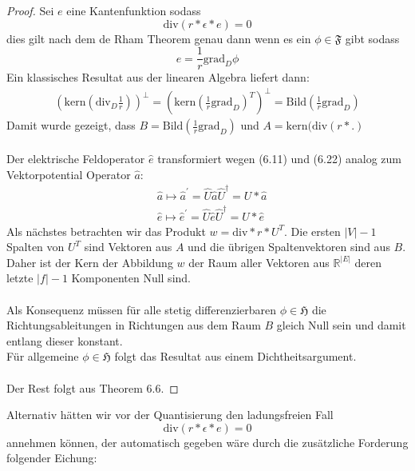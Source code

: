 \documentclass[11pt,a4paper,leqno]{report}
\numberwithin{equation}{chapter}
\begin{document}
\begin{proof}
	Sei $e$ eine Kantenfunktion sodass 
	\begin{equation*}
		\text{div}(r * \epsilon * e) = 0
	\end{equation*} dies gilt nach dem de Rham Theorem genau dann wenn es ein $\phi\in\mathfrak{F}$ gibt sodass 
\begin{equation*}
	e = \frac{1}{r}\text{grad}_D\phi
\end{equation*}
Ein klassisches Resultat aus der linearen Algebra liefert dann:
\begin{align*}
	 (\text{kern} (\text{div}_D\frac{1}{r}))^\perp 
	 =(\text{kern}(\frac{1}{r}\text{grad}_D)^T)^\perp =\text{Bild}(\frac{1}{r}\text{grad}_D)
\end{align*}
Damit wurde gezeigt, dass $B=\text{Bild}(\frac{1}{r}\text{grad}_D)$ und $A=\text{kern}(\text{div}(r*.)$\\
\\
Der elektrische Feldoperator $\hat{e}$ transformiert wegen (6.11) und (6.22) analog zum Vektorpotential Operator $\hat{a}$:
\begin{align}
	&\hat{a} \mapsto \hat{a}^{'} = \hat{U}\hat{a}\hat{U}^\dagger = U * \hat{a}\\
	&\hat{e} \mapsto \hat{e}^{'} = \hat{U}\hat{e}\hat{U}^\dagger = U * \hat{e}
\end{align}
Als n\"achstes betrachten wir das Produkt $w = \text{div} * r * U^T$.
Die ersten $|V| - 1$ Spalten von $U^T$ sind Vektoren aus $A$ und die \"ubrigen Spaltenvektoren sind aus $B$. Daher ist der Kern der Abbildung $w$ der Raum aller Vektoren aus $\mathbb{R}^{|E|}$ deren letzte $|f| - 1$ Komponenten Null sind.\\
\\
Als Konsequenz m\"ussen f\"ur alle stetig differenzierbaren $\phi\in\mathfrak{H}$ die Richtungsableitungen in Richtungen aus dem Raum $B$ gleich Null sein und damit entlang dieser konstant.\\
F\"ur allgemeine $\phi\in\mathfrak{H}$ folgt das Resultat aus einem Dichtheitsargument.\\
\\
Der Rest folgt aus Theorem 6.6.
\end{proof}
\noindent
Alternativ h\"atten wir vor der Quantisierung den ladungsfreien Fall
 \begin{equation}
 	\text{div}(r * \epsilon * e) = 0
 \end{equation}
 annehmen k\"onnen, der automatisch gegeben w\"are durch die zus\"atzliche Forderung folgender Eichung:
\end{document}
